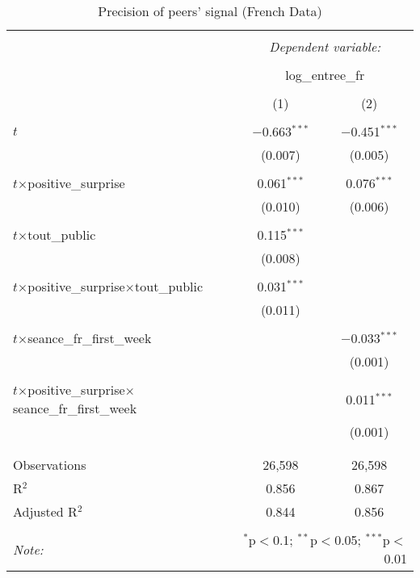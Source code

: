\begin{table}[!htbp] \centering 
	\caption{Precision of peers' signal (French Data)} 
  \label{precisionsignal} 
\begin{tabular}{@{\extracolsep{5pt}}lcc} 
\\[-1.8ex]\hline 
\hline \\[-1.8ex] 
 & \multicolumn{2}{c}{\textit{Dependent variable:}} \\ 
\cline{2-3} 
\\[-1.8ex] & \multicolumn{2}{c}{log\_entree\_fr} \\ 
\\[-1.8ex] & (1) & (2)\\ 
\hline \\[-1.8ex] 
 $t$ & $-$0.663$^{***}$ & $-$0.451$^{***}$ \\ 
  & (0.007) & (0.005) \\ 
  & & \\ 
 $t$$\times$positive\_surprise & 0.061$^{***}$ & 0.076$^{***}$ \\ 
  & (0.010) & (0.006) \\ 
  & & \\ 
 $t$$\times$tout\_public & 0.115$^{***}$ &  \\ 
  & (0.008) &  \\ 
  & & \\ 
 $t$$\times$positive\_surprise$\times$tout\_public & 0.031$^{***}$ &  \\ 
  & (0.011) &  \\ 
  & & \\ 
 $t$$\times$seance\_fr\_first\_week &  & $-$0.033$^{***}$ \\ 
  &  & (0.001) \\ 
  & & \\ 
 $t$$\times$positive\_surprise$\times$seance\_fr\_first\_week &  & 0.011$^{***}$ \\ 
  &  & (0.001) \\ 
  & & \\ 
\hline \\[-1.8ex] 
Observations & 26,598 & 26,598 \\ 
R$^{2}$ & 0.856 & 0.867 \\ 
Adjusted R$^{2}$ & 0.844 & 0.856 \\ 
\hline 
\hline \\[-1.8ex] 
\textit{Note:}  & \multicolumn{2}{r}{$^{*}$p$<$0.1; $^{**}$p$<$0.05; $^{***}$p$<$0.01} \\ 
\end{tabular} 
\end{table}


